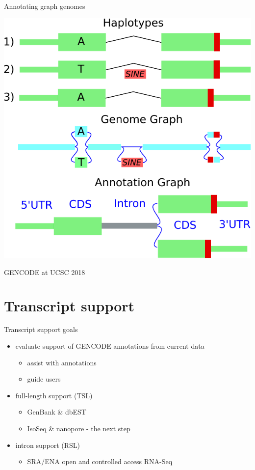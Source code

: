 \documentclass[10pt,
               hyperref={bookmarks=false,
                         bookmarksopen=false,
                         colorlinks=true,
                         linkcolor=blue,
                         urlcolor=blue},
               xcolor={svgnames,table}]{beamer}
\newcommand{\sectionframe}[1]{
  \begin{frame}{\thetitle}
    \section{#1}
  \end{frame}
}
\newenvironment{tightitemize}{%
\begin{itemize}
  \setlength{\itemsep}{1pt}%
  \setlength{\parskip}{0pt}%
  \setlength{\parsep}{0pt}%
}{\end{itemize}}
\newcommand{\thetitle}{GENCODE at UCSC 2018}
\begin{document}
\begin{frame}{Annotating graph genomes}
  \begin{center}
    \includegraphics[scale=0.65]{images/graph-annotation.pdf}
  \end{center}
\end{frame}

\sectionframe{Transcript support}
\begin{frame}{Transcript support goals}
  \begin{itemize}
  \item evaluate support of GENCODE annotations from current data
    \begin{tightitemize}
    \item assist with annotations
    \item guide users
    \end{tightitemize}
  \item full-length support (TSL)
    \begin{tightitemize}
    \item GenBank \& dbEST 
    \item IsoSeq \& nanopore - the next step
    \end{tightitemize}
  \item intron support (RSL)
    \begin{tightitemize}
    \item SRA/ENA open and controlled access RNA-Seq
    \end{tightitemize}
  \end{itemize}
\end{frame}
\end{document}
